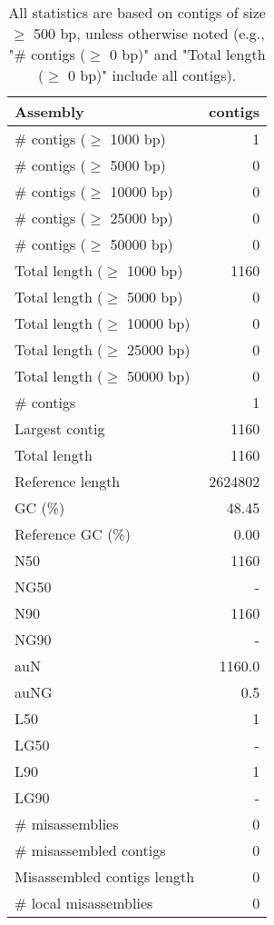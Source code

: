 \documentclass[12pt,a4paper]{article}
\begin{document}
\begin{table}[ht]
\begin{center}
\caption{All statistics are based on contigs of size $\geq$ 500 bp, unless otherwise noted (e.g., "\# contigs ($\geq$ 0 bp)" and "Total length ($\geq$ 0 bp)" include all contigs).}
\begin{tabular}{|l*{1}{|r}|}
\hline
Assembly & contigs \\ \hline
\# contigs ($\geq$ 1000 bp) & 1 \\ \hline
\# contigs ($\geq$ 5000 bp) & 0 \\ \hline
\# contigs ($\geq$ 10000 bp) & 0 \\ \hline
\# contigs ($\geq$ 25000 bp) & 0 \\ \hline
\# contigs ($\geq$ 50000 bp) & 0 \\ \hline
Total length ($\geq$ 1000 bp) & 1160 \\ \hline
Total length ($\geq$ 5000 bp) & 0 \\ \hline
Total length ($\geq$ 10000 bp) & 0 \\ \hline
Total length ($\geq$ 25000 bp) & 0 \\ \hline
Total length ($\geq$ 50000 bp) & 0 \\ \hline
\# contigs & 1 \\ \hline
Largest contig & 1160 \\ \hline
Total length & 1160 \\ \hline
Reference length & 2624802 \\ \hline
GC (\%) & 48.45 \\ \hline
Reference GC (\%) & 0.00 \\ \hline
N50 & 1160 \\ \hline
NG50 & - \\ \hline
N90 & 1160 \\ \hline
NG90 & - \\ \hline
auN & 1160.0 \\ \hline
auNG & 0.5 \\ \hline
L50 & 1 \\ \hline
LG50 & - \\ \hline
L90 & 1 \\ \hline
LG90 & - \\ \hline
\# misassemblies & 0 \\ \hline
\# misassembled contigs & 0 \\ \hline
Misassembled contigs length & 0 \\ \hline
\# local misassemblies & 0 \\ \hline

\end{tabular}
\end{center}
\end{table}
\end{document}
